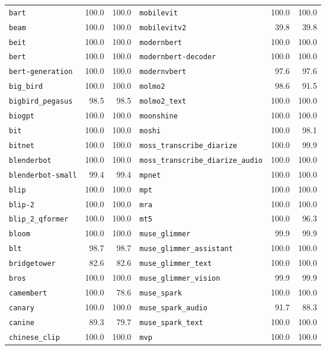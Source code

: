 \begin{longtable}{@{}lrr@{\hspace{24pt}}lrr@{}}
\texttt{bart} & 100.0 & 100.0 & \texttt{mobilevit} & 100.0 & 100.0 \\
\texttt{beam} & 100.0 & 100.0 & \texttt{mobilevitv2} & 39.8 & 39.8 \\
\texttt{beit} & 100.0 & 100.0 & \texttt{modernbert} & 100.0 & 100.0 \\
\texttt{bert} & 100.0 & 100.0 & \texttt{modernbert-decoder} & 100.0 & 100.0 \\
\texttt{bert-generation} & 100.0 & 100.0 & \texttt{modernvbert} & 97.6 & 97.6 \\
\texttt{big\_bird} & 100.0 & 100.0 & \texttt{molmo2} & 98.6 & 91.5 \\
\texttt{bigbird\_pegasus} & 98.5 & 98.5 & \texttt{molmo2\_text} & 100.0 & 100.0 \\
\texttt{biogpt} & 100.0 & 100.0 & \texttt{moonshine} & 100.0 & 100.0 \\
\texttt{bit} & 100.0 & 100.0 & \texttt{moshi} & 100.0 & 98.1 \\
\texttt{bitnet} & 100.0 & 100.0 & \texttt{moss\_transcribe\_diarize} & 100.0 & 99.9 \\
\texttt{blenderbot} & 100.0 & 100.0 & \texttt{moss\_transcribe\_diarize\_audio} & 100.0 & 100.0 \\
\texttt{blenderbot-small} & 99.4 & 99.4 & \texttt{mpnet} & 100.0 & 100.0 \\
\texttt{blip} & 100.0 & 100.0 & \texttt{mpt} & 100.0 & 100.0 \\
\texttt{blip-2} & 100.0 & 100.0 & \texttt{mra} & 100.0 & 100.0 \\
\texttt{blip\_2\_qformer} & 100.0 & 100.0 & \texttt{mt5} & 100.0 & 96.3 \\
\texttt{bloom} & 100.0 & 100.0 & \texttt{muse\_glimmer} & 99.9 & 99.9 \\
\texttt{blt} & 98.7 & 98.7 & \texttt{muse\_glimmer\_assistant} & 100.0 & 100.0 \\
\texttt{bridgetower} & 82.6 & 82.6 & \texttt{muse\_glimmer\_text} & 100.0 & 100.0 \\
\texttt{bros} & 100.0 & 100.0 & \texttt{muse\_glimmer\_vision} & 99.9 & 99.9 \\
\texttt{camembert} & 100.0 & 78.6 & \texttt{muse\_spark} & 100.0 & 100.0 \\
\texttt{canary} & 100.0 & 100.0 & \texttt{muse\_spark\_audio} & 91.7 & 88.3 \\
\texttt{canine} & 89.3 & 79.7 & \texttt{muse\_spark\_text} & 100.0 & 100.0 \\
\texttt{chinese\_clip} & 100.0 & 100.0 & \texttt{mvp} & 100.0 & 100.0 \\

\end{longtable}

